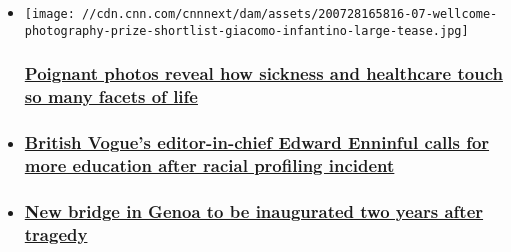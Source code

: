 \begin{itemize}
\item
  \href{/style/article/wellcome-photography-prize-shortlist-wellness/index.html}{}

  \texttt{[image: //cdn.cnn.com/cnnnext/dam/assets/200728165816-07-wellcome-photography-prize-shortlist-giacomo-infantino-large-tease.jpg]}

  \hypertarget{poignant-photos-reveal-how-sickness-and-healthcare-touch-so-many-facets-of-life}{%
  \subsubsection{\texorpdfstring{\href{/style/article/wellcome-photography-prize-shortlist-wellness/index.html}{Poignant
  photos reveal how sickness and healthcare touch so many facets of
  life}}{Poignant photos reveal how sickness and healthcare touch so many facets of life}}\label{poignant-photos-reveal-how-sickness-and-healthcare-touch-so-many-facets-of-life}}
\item
  \hypertarget{british-vogues-editor-in-chief-edward-enninful-calls-for-more-education-after-racial-profiling-incident-}{%
  \subsubsection{\texorpdfstring{\href{/style/article/edward-enninful-vogue-christiane-amanpour/index.html}{British
  Vogue's editor-in-chief Edward Enninful calls for more education after
  racial profiling incident
  }}{British Vogue's editor-in-chief Edward Enninful calls for more education after racial profiling incident }}\label{british-vogues-editor-in-chief-edward-enninful-calls-for-more-education-after-racial-profiling-incident-}}
\item
  \hypertarget{new-bridge-in-genoa-to-be-inaugurated-two-years-after-tragedy}{%
  \subsubsection{\texorpdfstring{\href{/style/article/new-genoa-bridge-inauguration-scli-intl/index.html}{New
  bridge in Genoa to be inaugurated two years after
  tragedy}}{New bridge in Genoa to be inaugurated two years after tragedy}}\label{new-bridge-in-genoa-to-be-inaugurated-two-years-after-tragedy}}
\end{itemize}

